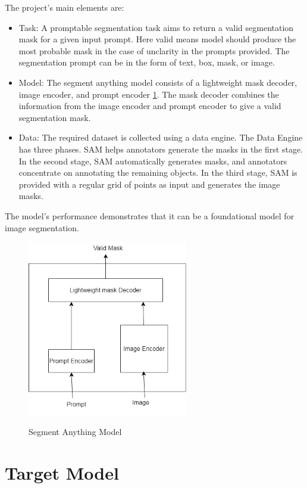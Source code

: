 The project's main elements are:
\begin{itemize}
    \item Task: A promptable segmentation task aims to return a valid segmentation mask for a given input prompt. Here valid means model should produce the most probable mask in the case of unclarity in the prompts provided. The segmentation prompt can be in the form of text, box, mask, or image.
    \item Model: The segment anything model consists of a lightweight mask decoder, image encoder, and prompt encoder \ref{fig:segment}. The mask decoder combines the information from the image encoder and prompt encoder to give a valid segmentation mask.

    \item Data: The required dataset is collected using a data engine. The Data Engine has three phases. SAM helps annotators generate the masks in the first stage. In the second stage, SAM automatically generates masks, and annotators concentrate on annotating the remaining objects. In the third stage, SAM is provided with a regular grid of points as input and generates the image masks.
\end{itemize}
The model's performance demonstrates that it can be a foundational model for image segmentation.
\begin{figure}[H]
\centering
	\includegraphics*[width = 7cm]{images/segment.png}
	 \caption{Segment Anything Model}\cite{Segment}
	\label{fig:segment}
\end{figure}

\section{Target Model} 

